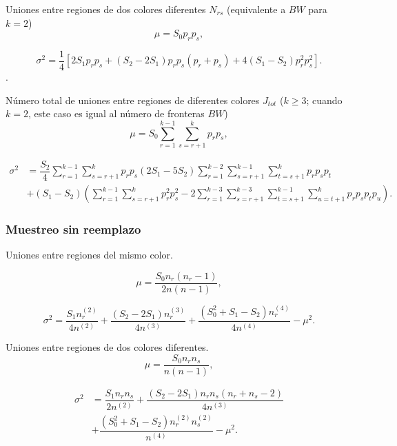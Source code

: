 Uniones entre regiones de dos colores diferentes $N_{rs}$ (equivalente a $BW$ para $k=2$)
\begin{equation}
\mu = S_0 p_r p_s,
\end{equation}

\begin{equation}
\sigma^2 = \dfrac{1}{4} \left[ 2S_1 p_r p_s + (S_2-2S_1)p_r p_s(p_r+p_s) + 4(S_1-S_2)p_r^2 p_s^2 \right] .
\end{equation}.

Número total de uniones entre regiones de diferentes colores $J_{tot}$ ($k \geq 3$; cuando $k=2$, este caso es igual al número de fronteras $BW$)
\begin{equation}
 \mu = S_0 \sum_{r=1}^{k-1} \sum_{s=r+1}^{k} p_r p_s,
\end{equation}

\begin{align}
\sigma^2 &= \dfrac{S_2}{4} \sum_{r=1}^{k-1} \sum_{s=r+1}^{k} p_r p_s (2S_1-5S_2) \sum_{r=1}^{k-2} \sum_{s=r+1}^{k-1} \sum_{t=s+1}^{k} p_r p_s p_t \\ \nonumber
          & + (S_1-S_2)\left(\sum_{r=1}^{k-1} \sum_{s=r+1}^{k} p_r^2 p_s^2 - 2  \sum_{r=1}^{k-3} \sum_{s=r+1}^{k-3} \sum_{t=s+1}^{k-1} \sum_{u=t+1}^{k}p_r p_s p_t p_u \right) . 
\end{align}

\subsubsection*{Muestreo sin reemplazo}
Uniones entre regiones del mismo color.

\begin{equation}
\mu = \dfrac{S_0n_r(n_r-1)}{2n(n-1)} ,
\end{equation}

\begin{equation}
\sigma^2 = \dfrac{S_1n_r^{(2)}}{4n^{(2)}} + \dfrac{(S_2-2S_1)n_r^{(3)}}{4n^{(3)}} + \dfrac{(S_0^2+S_1-S_2)n_r^{(4)}}{4n^{(4)}}-\mu^2 .
\end{equation}

Uniones entre regiones de dos colores diferentes.
\begin{equation}
\mu = \dfrac{S_0n_r n_s}{n(n-1)},
\end{equation}

\begin{align}
\sigma^2 &=\dfrac{S_1 n_r n_s}{2n^{(2)}} +  \dfrac{(S_2-2S_1)n_r n_s(n_r+n_s-2)}{4n^{(3)}} \\ \nonumber
         &+ \dfrac{(S_0^2+S_1-S_2)n_r^{(2)}n_s^{(2)}}{n^{(4)}}-\mu^2 .
\end{align}

